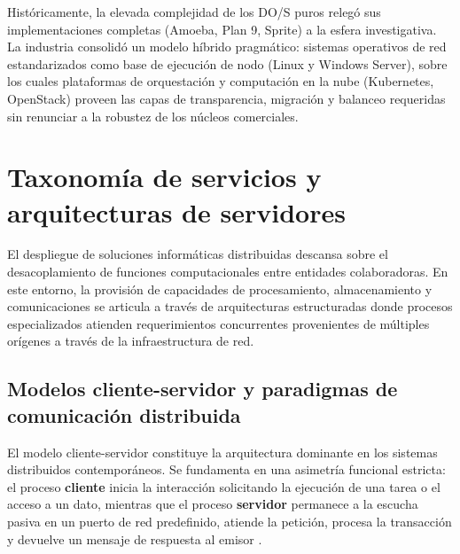 \documentclass[12pt]{article}
\begin{document}
Históricamente, la elevada complejidad de los DO/S puros relegó sus implementaciones completas (Amoeba, Plan 9, Sprite) a la esfera investigativa. La industria consolidó un modelo híbrido pragmático: sistemas operativos de red estandarizados como base de ejecución de nodo (Linux y Windows Server), sobre los cuales plataformas de orquestación y computación en la nube (Kubernetes, OpenStack) proveen las capas de transparencia, migración y balanceo requeridas sin renunciar a la robustez de los núcleos comerciales.

\section{Taxonomía de servicios y arquitecturas de servidores}
\label{sec:taxonomiaServiciosServidores}

El despliegue de soluciones informáticas distribuidas descansa sobre el desacoplamiento de funciones computacionales entre entidades colaboradoras. En este entorno, la provisión de capacidades de procesamiento, almacenamiento y comunicaciones se articula a través de arquitecturas estructuradas donde procesos especializados atienden requerimientos concurrentes provenientes de múltiples orígenes a través de la infraestructura de red.

\subsection{Modelos cliente-servidor y paradigmas de comunicación distribuida}
\label{sec:modelosClienteServidor}

El modelo cliente-servidor constituye la arquitectura dominante en los sistemas distribuidos contemporáneos. Se fundamenta en una asimetría funcional estricta: el proceso \textbf{cliente} inicia la interacción solicitando la ejecución de una tarea o el acceso a un dato, mientras que el proceso \textbf{servidor} permanece a la escucha pasiva en un puerto de red predefinido, atiende la petición, procesa la transacción y devuelve un mensaje de respuesta al emisor \parencite[\S 1.12, p.\ 26]{silberschatz2006fundamentos}. 
\end{document}
